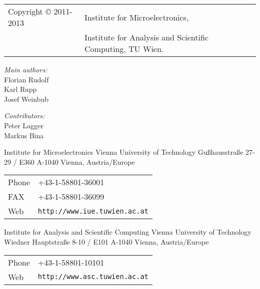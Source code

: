 
\clearpage

\begin{tabular}{ll}
Copyright {\copyright} 2011-2013 & Institute for Microelectronics, \\
                            & Institute for Analysis and Scientific Computing, TU Wien.
\end{tabular}

\vspace{2.5cm}

\textit{Main authors:}\\ 

Florian Rudolf \\
Karl Rupp\\
Josef Weinbub \\

\vspace{1cm}

\textit{Contributors:}\\ 

Peter Lagger \\
Markus Bina


\vspace{3.0cm}

Institute for Microelectronics\newline
Vienna University of Technology\newline
Gu\ss hausstra\ss e 27-29 / E360\newline
A-1040 Vienna, Austria/Europe\newline

\begin{tabular}{ll}
Phone  & +43-1-58801-36001\\
FAX    & +43-1-58801-36099\\
Web    & \texttt{http://www.iue.tuwien.ac.at}
\end{tabular}

\vspace{1.5cm}

Institute for Analysis and Scientific Computing\newline
Vienna University of Technology\newline
Wiedner Hauptstra\ss e 8-10 / E101\newline
A-1040 Vienna, Austria/Europe\newline

\begin{tabular}{ll}
Phone  & +43-1-58801-10101\\
Web    & \texttt{http://www.asc.tuwien.ac.at}
\end{tabular}





